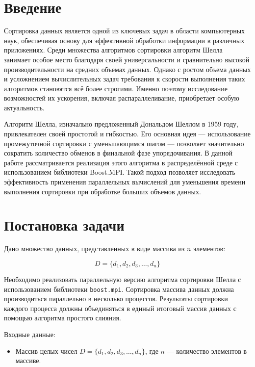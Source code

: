 \documentclass{report}
\begin{document}
\setcounter{page}{2}
\tableofcontents

\newpage

\newpage
\section*{Введение}

Сортировка данных является одной из ключевых задач в области компьютерных наук, обеспечивая основу для эффективной обработки информации в различных приложениях. Среди множества алгоритмов сортировки алгоритм Шелла занимает особое место благодаря своей универсальности и сравнительно высокой производительности на средних объемах данных. Однако с ростом объема данных и усложнением вычислительных задач требования к скорости выполнения таких алгоритмов становятся всё более строгими. Именно поэтому исследование возможностей их ускорения, включая распараллеливание, приобретает особую актуальность. 

Алгоритм Шелла, изначально предложенный Дональдом Шеллом в 1959 году, привлекателен своей простотой и гибкостью. Его основная идея — использование промежуточной сортировки с уменьшающимся шагом — позволяет значительно сократить количество обменов в финальной фазе упорядочивания. В данной работе рассматривается реализация этого алгоритма в распределённой среде с использованием библиотеки Boost.MPI. Такой подход позволяет исследовать эффективность применения параллельных вычислений для уменьшения времени выполнения сортировки при обработке больших объемов данных.

\newpage

\section*{Постановка задачи}  

Дано множество данных, представленных в виде массива из $n$ элементов:

\[
D = \{ d_1, d_2, d_3, \dots, d_n \}
\]

Необходимо реализовать параллельную версию алгоритма сортировки Шелла с использованием библиотеки \texttt{boost.mpi}. Сортировка массива данных должна производиться параллельно в несколько процессов. Результаты сортировки каждого процесса должны объединяться в единый итоговый массив данных с помощью алгоритма простого слияния.

Входные данные:
\begin{itemize}
    \item Массив целых чисел $D = \{ d_1, d_2, d_3, \dots, d_n \}$, где $n$ — количество элементов в массиве.
\end{itemize}
\end{document}
